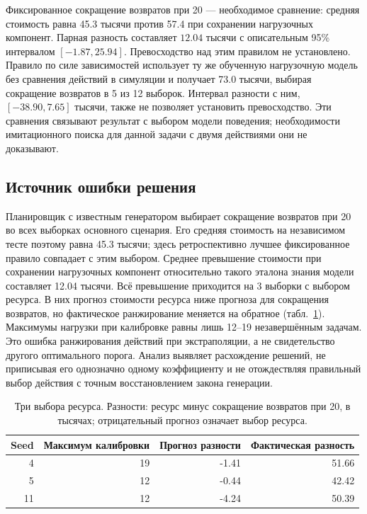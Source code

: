 Фиксированное сокращение возвратов при 20 --- необходимое сравнение: средняя стоимость равна 45.3 тысячи против 57.4 при сохранении нагрузочных компонент. Парная разность составляет $12.04$ тысячи с описательным 95\% интервалом $[-1.87,25.94]$. Превосходство над этим правилом не установлено. Правило по силе зависимостей использует ту же обученную нагрузочную модель без сравнения действий в симуляции и получает 73.0 тысячи, выбирая сокращение возвратов в 5 из 12 выборок. Интервал разности с ним, $[-38.90,7.65]$ тысячи, также не позволяет установить превосходство. Эти сравнения связывают результат с выбором модели поведения; необходимости имитационного поиска для данной задачи с двумя действиями они не доказывают.

\subsection{Источник ошибки решения}
Планировщик с известным генератором выбирает сокращение возвратов при 20 во всех выборках основного сценария. Его средняя стоимость на независимом тесте поэтому равна 45.3 тысячи; здесь ретроспективно лучшее фиксированное правило совпадает с этим выбором. Среднее превышение стоимости при сохранении нагрузочных компонент относительно такого эталона знания модели составляет 12.04 тысячи. Всё превышение приходится на 3 выборки с выбором ресурса. В них прогноз стоимости ресурса ниже прогноза для сокращения возвратов, но фактическое ранжирование меняется на обратное (табл.~\ref{tab:choices}). Максимумы нагрузки при калибровке равны лишь 12--19 незавершённым задачам. Это ошибка ранжирования действий при экстраполяции, а не свидетельство другого оптимального порога. Анализ выявляет расхождение решений, не приписывая его однозначно одному коэффициенту и не отождествляя правильный выбор действия с точным восстановлением закона генерации.
\begin{table}[t]\caption{Три выбора ресурса. Разности: ресурс минус сокращение возвратов при 20, в тысячах; отрицательный прогноз означает выбор ресурса.}\label{tab:choices}\centering\small\setlength{\tabcolsep}{3pt}\begin{tabular}{rrrr}\toprule
Seed & Максимум калибровки & Прогноз разности & Фактическая разность\\\midrule
4 & 19 & -1.41 & 51.66 \\
5 & 12 & -0.44 & 42.42 \\
11 & 12 & -4.24 & 50.39 \\
\bottomrule\end{tabular}\end{table}
